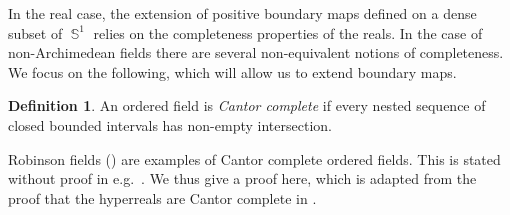 \documentclass{amsart}
\theoremstyle{plain}
\theoremstyle{definition}
\newtheorem{definition}[proposition]{Definition}
\DeclareMathOperator{\Sb}{\mathbb{S}}
\newcommand{\1}{\mathbf{1}}
\begin{document}
In the real case, the extension of positive boundary maps defined on a dense subset of $\Sb^1$ relies on the completeness properties of the reals. In the case of non-Archimedean fields there are several non-equivalent notions of completeness. We focus on the following, which will allow us to extend boundary maps.

\begin{definition}\label{dfn: Cantor complete}
    An ordered field is \emph{Cantor complete} if every nested sequence of closed bounded intervals has non-empty intersection.
\end{definition}

Robinson fields () are examples of Cantor complete ordered fields. This is stated without proof in e.g.\ \cite[Example 6.10]{hall2015ordered}. We thus give a proof here, which is adapted from the proof that the hyperreals are Cantor complete in \cite[Theorem 11.10.1]{Goldblatt}.
\end{document}
